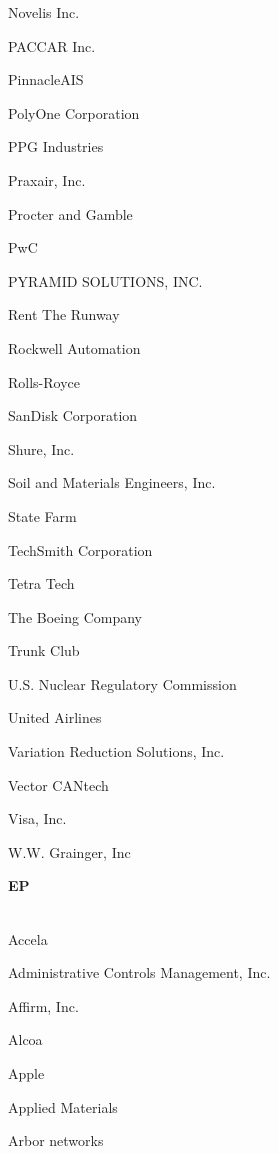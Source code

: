 \documentclass[twoside]{article}
\begin{document}
\begin{center}
\begin{multicols}{5}
\begin{FlushLeft}
\begin{compactitem}
\item Novelis Inc.
\item PACCAR Inc.
\item PinnacleAIS
\item PolyOne Corporation
\item PPG Industries
\item Praxair, Inc.
\item Procter and Gamble
\item PwC
\item PYRAMID SOLUTIONS, INC.
\item Rent The Runway
\item Rockwell Automation
\item Rolls-Royce
\item SanDisk Corporation
\item Shure, Inc.
\item Soil and Materials Engineers, Inc.
\item State Farm
\item TechSmith Corporation
\item Tetra Tech
\item The Boeing Company
\item Trunk Club
\item U.S. Nuclear Regulatory Commission
\item United Airlines
\item Variation Reduction Solutions, Inc.
\item Vector CANtech
\item Visa, Inc.
\item W.W. Grainger, Inc
\end{compactitem}
        \end{FlushLeft}
        \vspace{1em}
        {\fontsize{14}{16}\selectfont \bf EP}\\
        \vspace{-1em}
        ~\hrulefill~
        \vspace{-.9em}
        \begin{FlushLeft}
        \begin{compactitem}
        \item Accela
\item Administrative Controls Management, Inc.
\item Affirm, Inc.
\item Alcoa
\item Apple
\item Applied Materials
\item Arbor networks

\end{compactitem}
\end{FlushLeft}
\end{multicols}
\end{center}
\end{document}
